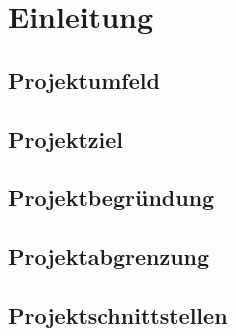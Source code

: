 \section{Einleitung}
\label{sec:Einleitung}

\subsection{Projektumfeld}
\label{sec:Projektumfeld}


\subsection{Projektziel}
\label{sec:Projektziel}


\subsection{Projektbegründung}
\label{sec:Projektbegruendung}


\subsection{Projektabgrenzung}
\label{sec:Projektabgrenzung}


\subsection{Projektschnittstellen}
\label{sec:Projektschnittstellen}

